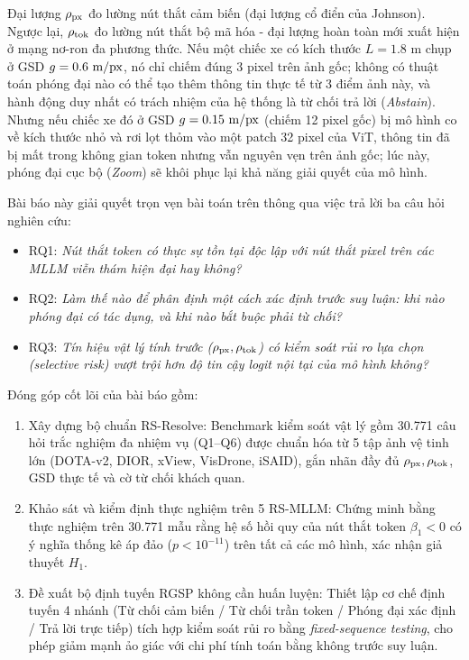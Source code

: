 Đại lượng $\rho_{\mathrm{px}}$ đo lường nút thắt cảm biến (đại lượng cổ điển của Johnson). Ngược lại, $\rho_{\mathrm{tok}}$ đo lường nút thắt bộ mã hóa - đại lượng hoàn toàn mới xuất hiện ở mạng nơ-ron đa phương thức. Nếu một chiếc xe có kích thước $L = 1.8\text{ m}$ chụp ở GSD $g = 0.6\text{ m/px}$, nó chỉ chiếm đúng 3 pixel trên ảnh gốc; không có thuật toán phóng đại nào có thể tạo thêm thông tin thực tế từ 3 điểm ảnh này, và hành động duy nhất có trách nhiệm của hệ thống là từ chối trả lời (\textit{Abstain}). Nhưng nếu chiếc xe đó ở GSD $g = 0.15\text{ m/px}$ (chiếm 12 pixel gốc) bị mô hình co về kích thước nhỏ và rơi lọt thỏm vào một patch 32 pixel của ViT, thông tin đã bị mất trong không gian token nhưng vẫn nguyên vẹn trên ảnh gốc; lúc này, phóng đại cục bộ (\textit{Zoom}) sẽ khôi phục lại khả năng giải quyết của mô hình.

Bài báo này giải quyết trọn vẹn bài toán trên thông qua việc trả lời ba câu hỏi nghiên cứu:
\begin{itemize}
    \item RQ1: \textit{Nút thắt token có thực sự tồn tại độc lập với nút thắt pixel trên các MLLM viễn thám hiện đại hay không?}
    \item RQ2: \textit{Làm thế nào để phân định một cách xác định trước suy luận: khi nào phóng đại có tác dụng, và khi nào bắt buộc phải từ chối?}
    \item RQ3: \textit{Tín hiệu vật lý tính trước ($\rho_{\mathrm{px}}, \rho_{\mathrm{tok}}$) có kiểm soát rủi ro lựa chọn (selective risk) vượt trội hơn độ tin cậy logit nội tại của mô hình không?}
\end{itemize}

Đóng góp cốt lõi của bài báo gồm:
\begin{enumerate}
    \item Xây dựng bộ chuẩn RS-Resolve: Benchmark kiểm soát vật lý gồm 30.771 câu hỏi trắc nghiệm đa nhiệm vụ (Q1--Q6) được chuẩn hóa từ 5 tập ảnh vệ tinh lớn (DOTA-v2, DIOR, xView, VisDrone, iSAID), gắn nhãn đầy đủ $\rho_{\mathrm{px}}, \rho_{\mathrm{tok}}$, GSD thực tế và cờ từ chối khách quan.
    \item Khảo sát và kiểm định thực nghiệm trên 5 RS-MLLM: Chứng minh bằng thực nghiệm trên 30.771 mẫu rằng hệ số hồi quy của nút thắt token $\beta_1 < 0$ có ý nghĩa thống kê áp đảo ($p < 10^{-11}$) trên tất cả các mô hình, xác nhận giả thuyết $H_1$.
    \item Đề xuất bộ định tuyến RGSP không cần huấn luyện: Thiết lập cơ chế định tuyến 4 nhánh (Từ chối cảm biến / Từ chối trần token / Phóng đại xác định / Trả lời trực tiếp) tích hợp kiểm soát rủi ro bằng \textit{fixed-sequence testing}, cho phép giảm mạnh ảo giác với chi phí tính toán bằng không trước suy luận.
\end{enumerate}
